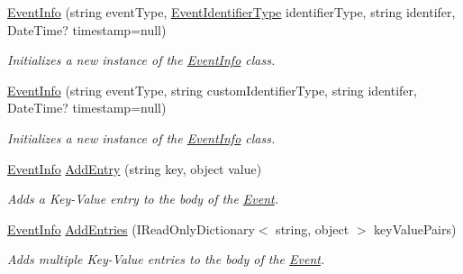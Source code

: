 \begin{DoxyCompactItemize}
\item 
\mbox{\hyperlink{class_blue_cats_1_1_loop_1_1_api_1_1_client_1_1_models_1_1_event_info_ad4fc925ea944b374f896aa176679d8b7}{Event\+Info}} (string event\+Type, \mbox{\hyperlink{namespace_blue_cats_1_1_loop_1_1_api_1_1_client_1_1_models_a31a2ab154d0577f8b415d590bbee5d7c}{Event\+Identifier\+Type}} identifier\+Type, string identifer, Date\+Time? timestamp=null)
\begin{DoxyCompactList}\small\item\em Initializes a new instance of the \mbox{\hyperlink{class_blue_cats_1_1_loop_1_1_api_1_1_client_1_1_models_1_1_event_info}{Event\+Info}} class. \end{DoxyCompactList}\item 
\mbox{\hyperlink{class_blue_cats_1_1_loop_1_1_api_1_1_client_1_1_models_1_1_event_info_aef07d01558dc6b42069a6f2941532c53}{Event\+Info}} (string event\+Type, string custom\+Identifier\+Type, string identifer, Date\+Time? timestamp=null)
\begin{DoxyCompactList}\small\item\em Initializes a new instance of the \mbox{\hyperlink{class_blue_cats_1_1_loop_1_1_api_1_1_client_1_1_models_1_1_event_info}{Event\+Info}} class. \end{DoxyCompactList}\item 
\mbox{\hyperlink{class_blue_cats_1_1_loop_1_1_api_1_1_client_1_1_models_1_1_event_info}{Event\+Info}} \mbox{\hyperlink{class_blue_cats_1_1_loop_1_1_api_1_1_client_1_1_models_1_1_event_info_af1136bc0c4352fedd851550d3a8ace26}{Add\+Entry}} (string key, object value)
\begin{DoxyCompactList}\small\item\em Adds a Key-\/\+Value entry to the body of the \mbox{\hyperlink{class_blue_cats_1_1_loop_1_1_api_1_1_client_1_1_models_1_1_event}{Event}}. \end{DoxyCompactList}\item 
\mbox{\hyperlink{class_blue_cats_1_1_loop_1_1_api_1_1_client_1_1_models_1_1_event_info}{Event\+Info}} \mbox{\hyperlink{class_blue_cats_1_1_loop_1_1_api_1_1_client_1_1_models_1_1_event_info_acd18c21d352590df4e78fd222a5bd39f}{Add\+Entries}} (I\+Read\+Only\+Dictionary$<$ string, object $>$ key\+Value\+Pairs)
\begin{DoxyCompactList}\small\item\em Adds multiple Key-\/\+Value entries to the body of the \mbox{\hyperlink{class_blue_cats_1_1_loop_1_1_api_1_1_client_1_1_models_1_1_event}{Event}}. \end{DoxyCompactList}\end{DoxyCompactItemize}


